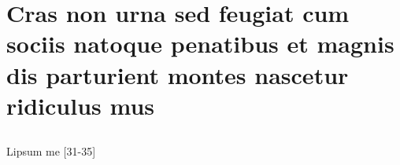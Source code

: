 


\chapter[Cras non urna sed feugiat]{Cras non urna sed feugiat cum sociis natoque penatibus et magnis dis
	parturient montes nascetur ridiculus mus}



\showfont
\section[Some encoding tests]{\showfont}
\subsection{\showfont}
\subsubsection{\showfont}
\subsubsubsection{\showfont}



Lipsum me [31-35]

